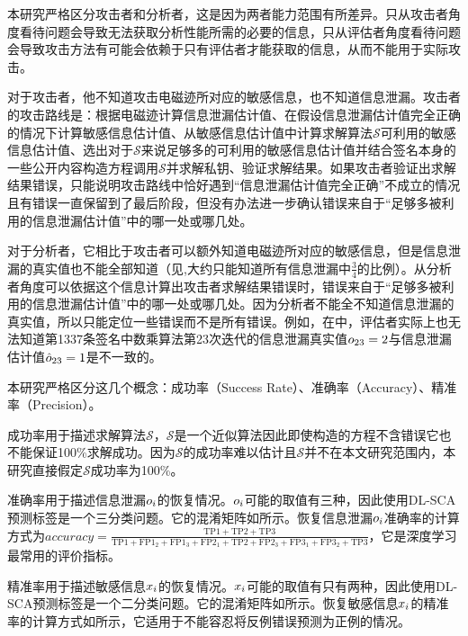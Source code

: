 {	本研究严格区分攻击者和分析者，这是因为两者能力范围有所差异。只从攻击者角度看待问题会导致无法获取分析性能所需的必要的信息，只从评估者角度看待问题会导致攻击方法有可能会依赖于只有评估者才能获取的信息，从而不能用于实际攻击。

	对于攻击者，他不知道攻击电磁迹所对应的敏感信息，也不知道信息泄漏。攻击者的攻击路线是：根据电磁迹计算信息泄漏估计值、在假设信息泄漏估计值完全正确的情况下计算敏感信息估计值、从敏感信息估计值中计算求解算法$\mathcal S$可利用的敏感信息估计值、选出对于$\mathcal S$来说足够多的可利用的敏感信息估计值并结合签名本身的一些公开内容构造方程调用$\mathcal S$并求解私钥、验证求解结果。如果攻击者验证出求解结果错误，只能说明攻击路线中恰好遇到“信息泄漏估计值完全正确”不成立的情况且有错误一直保留到了最后阶段，但没有办法进一步确认错误来自于“足够多被利用的信息泄漏估计值”中的哪一处或哪几处。

	对于分析者，它相比于攻击者可以额外知道电磁迹所对应的敏感信息，但是信息泄漏的真实值也不能全部知道（见,大约只能知道所有信息泄漏中$\frac34$的比例）。从分析者角度可以依据这个信息计算出攻击者求解结果错误时，错误来自于“足够多被利用的信息泄漏估计值”中的哪一处或哪几处。因为分析者不能全不知道信息泄漏的真实值，所以只能定位一些错误而不是所有错误。例如，在中，评估者实际上也无法知道第1337条签名中数乘算法第23次迭代的信息泄漏真实值$o_{23}=2$与信息泄漏估计值$\hat{o}_{23}=1$是不一致的。

	本研究严格区分这几个概念：成功率（Success Rate）、准确率（Accuracy）、精准率（Precision）。
	
	成功率用于描述求解算法$\mathcal S$，$\mathcal S$是一个近似算法因此即使构造的方程不含错误它也不能保证100\%求解成功。因为$\mathcal S$的成功率难以估计且$\mathcal S$并不在本文研究范围内，本研究直接假定$\mathcal S$成功率为100\%。
	
	准确率用于描述信息泄漏$o_i$的恢复情况。$o_i$可能的取值有三种，因此使用DL-SCA预测标签是一个三分类问题。它的混淆矩阵如所示。恢复信息泄漏$o_i$准确率的计算方式为$accuracy=\frac{\mathrm{TP}1+\mathrm{TP}2+\mathrm{TP}3}{\mathrm{TP}1+\mathrm{FP}1_2+\mathrm{FP}1_3+\mathrm{FP}2_1+\mathrm{TP}2+\mathrm{FP}2_3+\mathrm{FP}3_1+\mathrm{FP}3_2+\mathrm{TP}3}$，它是深度学习最常用的评价指标。

	精准率用于描述敏感信息$x_i$的恢复情况。$x_i$可能的取值有只有两种，因此使用DL-SCA预测标签是一个二分类问题。它的混淆矩阵如所示。恢复敏感信息$x_i$的精准率的计算方式如所示，它适用于不能容忍将反例错误预测为正例的情况。

}
